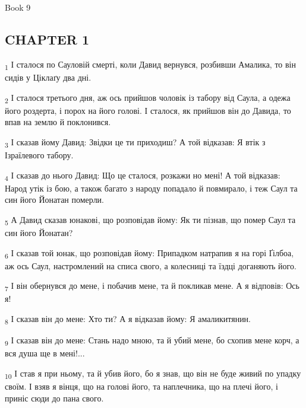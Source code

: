 Book 9
\subsection{CHAPTER 1}
\begin{tcolorbox}
\textsubscript{1} І сталося по Сауловій смерті, коли Давид вернувся, розбивши Амалика, то він сидів у Ціклаґу два дні.
\end{tcolorbox}
\begin{tcolorbox}
\textsubscript{2} І сталося третього дня, аж ось прийшов чоловік із табору від Саула, а одежа його роздерта, і порох на його голові. І сталося, як прийшов він до Давида, то впав на землю й поклонився.
\end{tcolorbox}
\begin{tcolorbox}
\textsubscript{3} І сказав йому Давид: Звідки це ти приходиш? А той відказав: Я втік з Ізраїлевого табору.
\end{tcolorbox}
\begin{tcolorbox}
\textsubscript{4} І сказав до нього Давид: Що це сталося, розкажи но мені! А той відказав: Народ утік із бою, а також багато з народу попадало й повмирало, і теж Саул та син його Йонатан померли.
\end{tcolorbox}
\begin{tcolorbox}
\textsubscript{5} А Давид сказав юнакові, що розповідав йому: Як ти пізнав, що помер Саул та син його Йонатан?
\end{tcolorbox}
\begin{tcolorbox}
\textsubscript{6} І сказав той юнак, що розповідав йому: Припадком натрапив я на горі Ґілбоа, аж ось Саул, настромлений на списа свого, а колесниці та їздці доганяють його.
\end{tcolorbox}
\begin{tcolorbox}
\textsubscript{7} І він обернувся до мене, і побачив мене, та й покликав мене. А я відповів: Ось я!
\end{tcolorbox}
\begin{tcolorbox}
\textsubscript{8} І сказав він до мене: Хто ти? А я відказав йому: Я амаликитянин.
\end{tcolorbox}
\begin{tcolorbox}
\textsubscript{9} І сказав він до мене: Стань надо мною, та й убий мене, бо схопив мене корч, а вся душа ще в мені!...
\end{tcolorbox}
\begin{tcolorbox}
\textsubscript{10} І став я при ньому, та й убив його, бо я знав, що він не буде живий по упадку своїм. І взяв я вінця, що на голові його, та наплечника, що на плечі його, і приніс сюди до пана свого.
\end{tcolorbox}
